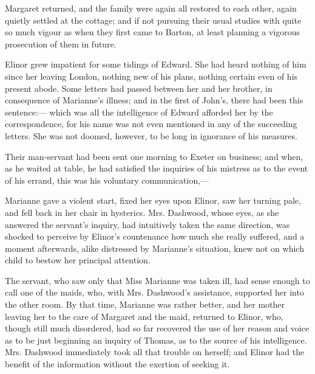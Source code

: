 Margaret returned, and the family were again all restored to each other, again quietly settled at the cottage; and if not pursuing their usual studies with quite so much vigour as when they first came to Barton, at least planning a vigorous prosecution of them in future.

Elinor grew impatient for some tidings of Edward. She had heard nothing of him since her leaving London, nothing new of his plans, nothing certain even of his present abode. Some letters had passed between her and her brother, in consequence of Marianne's illness; and in the first of John's, there had been this sentence:--- which was all the intelligence of Edward afforded her by the correspondence, for his name was not even mentioned in any of the succeeding letters. She was not doomed, however, to be long in ignorance of his measures.

Their man-servant had been sent one morning to Exeter on business; and when, as he waited at table, he had satisfied the inquiries of his mistress as to the event of his errand, this was his voluntary communication,---


Marianne gave a violent start, fixed her eyes upon Elinor, saw her turning pale, and fell back in her chair in hysterics. Mrs. Dashwood, whose eyes, as she answered the servant's inquiry, had intuitively taken the same direction, was shocked to perceive by Elinor's countenance how much she really suffered, and a moment afterwards, alike distressed by Marianne's situation, knew not on which child to bestow her principal attention.

The servant, who saw only that Miss Marianne was taken ill, had sense enough to call one of the maids, who, with Mrs. Dashwood's assistance, supported her into the other room. By that time, Marianne was rather better, and her mother leaving her to the care of Margaret and the maid, returned to Elinor, who, though still much disordered, had so far recovered the use of her reason and voice as to be just beginning an inquiry of Thomas, as to the source of his intelligence. Mrs. Dashwood immediately took all that trouble on herself; and Elinor had the benefit of the information without the exertion of seeking it.


